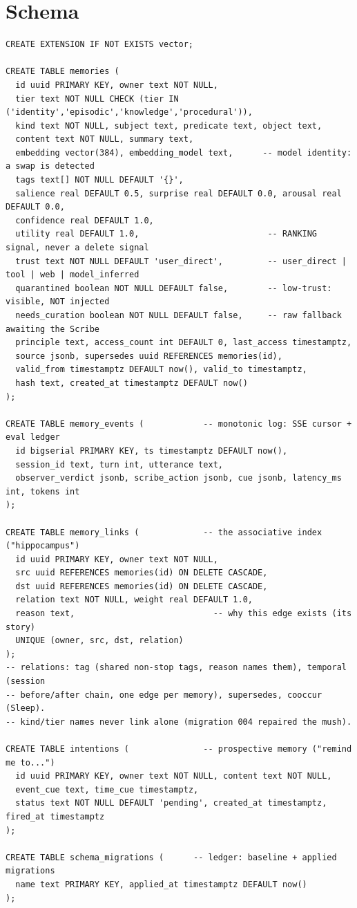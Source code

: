 \section{Schema}
\begin{Verbatim}[breaklines=true,fontsize=\small]
CREATE EXTENSION IF NOT EXISTS vector;

CREATE TABLE memories (
  id uuid PRIMARY KEY, owner text NOT NULL,
  tier text NOT NULL CHECK (tier IN ('identity','episodic','knowledge','procedural')),
  kind text NOT NULL, subject text, predicate text, object text,
  content text NOT NULL, summary text,
  embedding vector(384), embedding_model text,      -- model identity: a swap is detected
  tags text[] NOT NULL DEFAULT '{}',
  salience real DEFAULT 0.5, surprise real DEFAULT 0.0, arousal real DEFAULT 0.0,
  confidence real DEFAULT 1.0,
  utility real DEFAULT 1.0,                          -- RANKING signal, never a delete signal
  trust text NOT NULL DEFAULT 'user_direct',         -- user_direct | tool | web | model_inferred
  quarantined boolean NOT NULL DEFAULT false,        -- low-trust: visible, NOT injected
  needs_curation boolean NOT NULL DEFAULT false,     -- raw fallback awaiting the Scribe
  principle text, access_count int DEFAULT 0, last_access timestamptz,
  source jsonb, supersedes uuid REFERENCES memories(id),
  valid_from timestamptz DEFAULT now(), valid_to timestamptz,
  hash text, created_at timestamptz DEFAULT now()
);

CREATE TABLE memory_events (            -- monotonic log: SSE cursor + eval ledger
  id bigserial PRIMARY KEY, ts timestamptz DEFAULT now(),
  session_id text, turn int, utterance text,
  observer_verdict jsonb, scribe_action jsonb, cue jsonb, latency_ms int, tokens int
);

CREATE TABLE memory_links (             -- the associative index ("hippocampus")
  id uuid PRIMARY KEY, owner text NOT NULL,
  src uuid REFERENCES memories(id) ON DELETE CASCADE,
  dst uuid REFERENCES memories(id) ON DELETE CASCADE,
  relation text NOT NULL, weight real DEFAULT 1.0,
  reason text,                            -- why this edge exists (its story)
  UNIQUE (owner, src, dst, relation)
);
-- relations: tag (shared non-stop tags, reason names them), temporal (session
-- before/after chain, one edge per memory), supersedes, cooccur (Sleep).
-- kind/tier names never link alone (migration 004 repaired the mush).

CREATE TABLE intentions (               -- prospective memory ("remind me to...")
  id uuid PRIMARY KEY, owner text NOT NULL, content text NOT NULL,
  event_cue text, time_cue timestamptz,
  status text NOT NULL DEFAULT 'pending', created_at timestamptz, fired_at timestamptz
);

CREATE TABLE schema_migrations (      -- ledger: baseline + applied migrations
  name text PRIMARY KEY, applied_at timestamptz DEFAULT now()
);
\end{Verbatim}

